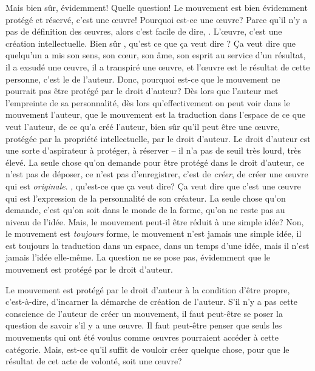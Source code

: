 {Mais bien s\^ur, \'evidemment! Quelle question! Le mouvement est
bien \'evidemment prot\'eg\'e et r\'eserv\'e, c'est une {\oe}uvre!
Pourquoi est{}-ce une {\oe}uvre? Parce qu'il n'y a pas de d\'efinition
des {\oe}uvres, alors c'est facile de dire, . L'{\oe}uvre, c'est une cr\'eation intellectuelle. Bien
s\^ur , qu'est ce que \c{c}a veut dire ?
\c{C}a veut dire que quelqu'un a mis son sens, son c{\oe}ur, son \^ame,
son esprit au service d'un r\'esultat, il a exsud\'e une {\oe}uvre, il
a transpir\'e une {\oe}uvre, et l'{\oe}uvre est le r\'esultat de cette
personne, c'est le  de l'auteur. Donc, pourquoi
est{}-ce que le mouvement ne pourrait pas \^etre prot\'eg\'e par le
droit d'auteur? D\`es lors que l'auteur met l'empreinte de sa
personnalit\'e, d\`es lors qu'effectivement on peut voir dans le
mouvement l'auteur, que le mouvement est la traduction dans l'espace de
ce que veut l'auteur, de ce qu'a cr\'e\'e l'auteur, bien s\^ur qu'il
peut \^etre une {\oe}uvre, prot\'eg\'ee par la propri\'et\'e
intellectuelle, par le droit d'auteur. Le droit d'auteur est une sorte
d'aspirateur \`a prot\'eger, \`a r\'eserver {--} il n'a pas de seuil
tr\`es lourd, tr\`es \'elev\'e. La seule chose qu'on demande pour
\^etre prot\'eg\'e dans le droit d'auteur, ce n'est pas de d\'eposer,
ce n'est pas d'enregistrer, c'est de {\em cr\'eer}, de cr\'eer une
{\oe}uvre qui est {\em originale}. , qu'est{}-ce que
\c{c}a veut dire? \c{C}a veut dire que c'est une {\oe}uvre qui est
l'expression de la personnalit\'e de son cr\'eateur. La seule chose
qu'on demande, c'est qu'on soit dans le monde de la forme, qu'on ne
reste pas au niveau de l'id\'ee. Mais, le mouvement peut{}-il \^etre
r\'eduit \`a une simple id\'ee? Non, le mouvement est {\em toujours}
forme, le mouvement n'est jamais une simple id\'ee, il est toujours la
traduction dans un espace, dans un temps d'une id\'ee, mais il n'est
jamais l'id\'ee elle{}-m\^eme. La question ne se pose pas, \'evidemment
que le mouvement est prot\'eg\'e par le droit d'auteur.\par

Le mouvement est prot\'eg\'e par le droit d'auteur \`a la condition
d'\^etre propre, c'est{}-\`a{}-dire, d'incarner la d\'emarche de
cr\'eation de l'auteur. S'il n'y a pas cette conscience de l'auteur de
cr\'eer un mouvement, il faut peut{}-\^etre se poser la question de
savoir s'il y a une {\oe}uvre. Il faut peut{}-\^etre penser que seuls
les mouvements qui ont \'et\'e voulus comme {\oe}uvres pourraient
acc\'eder \`a cette cat\'egorie. Mais, est{}-ce qu'il suffit de vouloir
cr\'eer quelque chose, pour que le r\'esultat de cet acte de volont\'e, soit une {\oe}uvre?\par

}
